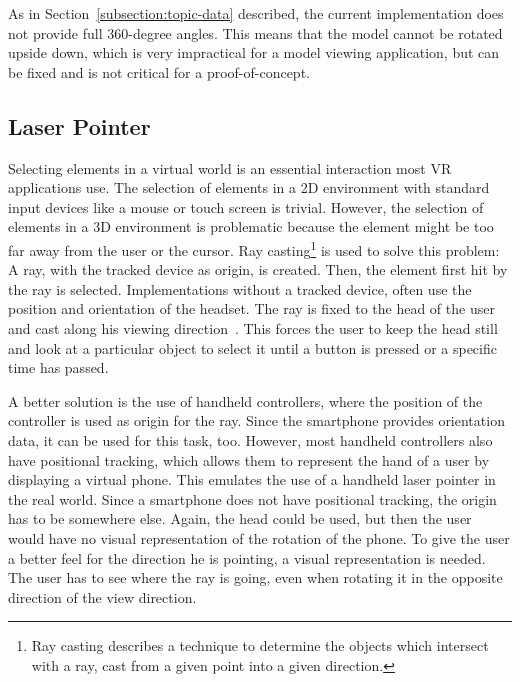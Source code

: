 As in Section~\ref{subsection:topic-data} described, the current implementation does not provide full 360-degree angles. This means that the model cannot be rotated upside down, which is very impractical for a model viewing application, but can be fixed and is not critical for a proof-of-concept.


\subsection{Laser Pointer}\label{subsection:laser-pointer}

Selecting elements in a virtual world is an essential interaction most \ac{VR} applications use. The selection of elements in a \ac{2D} environment with standard input devices like a mouse or touch screen is trivial. However, the selection of elements in a \ac{3D} environment is problematic because the element might be too far away from the user or the cursor. Ray casting\footnote{Ray casting describes a technique to determine the objects which intersect with a ray, cast from a given point into a given direction.} is used to solve this problem: A ray, with the tracked device as origin, is created. Then, the element first hit by the ray is selected. Implementations without a tracked device, often use the position and orientation of the headset. The ray is fixed to the head of the user and cast along his viewing direction~\cite[23]{Kamm.2018}. This forces the user to keep the head still and look at a particular object to select it until a button is pressed or a specific time has passed.


A better solution is the use of handheld controllers, where the position of the controller is used as origin for the ray. Since the smartphone provides orientation data, it can be used for this task, too. However, most handheld controllers also have positional tracking, which allows them to represent the hand of a user by displaying a virtual phone. This emulates the use of a handheld laser pointer in the real world. Since a smartphone does not have positional tracking, the origin has to be somewhere else. Again, the head could be used, but then the user would have no visual representation of the rotation of the phone. To give the user a better feel for the direction he is pointing, a visual representation is needed. The user has to see where the ray is going, even when rotating it in the opposite direction of the view direction.

